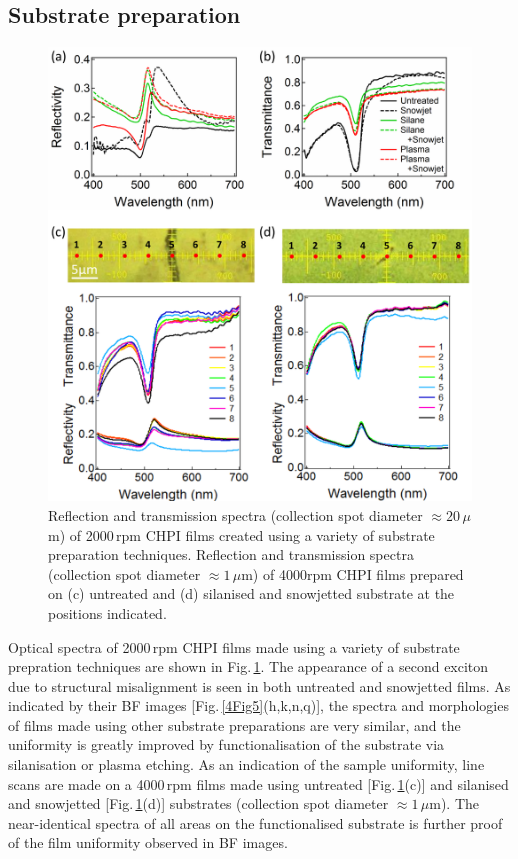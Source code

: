 \subsection{Substrate preparation}
\begin{figure}[] 
\centering    
\includegraphics[width=\textwidth]{Fig7}
\caption{Reflection and transmission spectra (collection spot diameter $\approx 20\,\mu$m) of 2000\,rpm CHPI films created using a variety of substrate preparation techniques. Reflection and transmission spectra (collection spot diameter $\approx1\,\mu$m) of 4000rpm CHPI films prepared on (c) untreated and (d) silanised and snowjetted substrate at the positions indicated.}
\label{4Fig7}
\end{figure}
Optical spectra of 2000\,rpm CHPI films made using a variety of substrate prepration techniques are shown in Fig.\,\ref{4Fig7}. The appearance of a second exciton due to structural misalignment is seen in both untreated and snowjetted films. As indicated by their BF images [Fig.\,\ref{4Fig5}(h,k,n,q)], the spectra and morphologies of films made using other substrate preparations are very similar, and the uniformity is greatly improved by functionalisation of the substrate via silanisation or plasma etching. As an indication of the sample uniformity, line scans are made on a 4000\,rpm films made using untreated [Fig.\,\ref{4Fig7}(c)] and silanised and snowjetted [Fig.\,\ref{4Fig7}(d)] substrates (collection spot diameter $\approx1\,\mu$m). The near-identical spectra of all areas on the functionalised substrate is further proof of the film uniformity observed in BF images.

